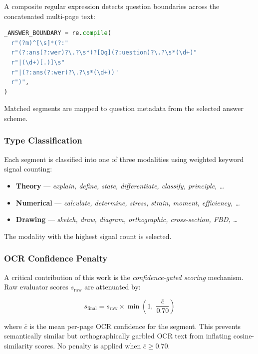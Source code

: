 \documentclass[conference]{IEEEtran}
\begin{document}
A composite regular expression detects question boundaries across the concatenated multi-page text:

\begin{lstlisting}[language=Python, caption={Answer boundary regex}]
_ANSWER_BOUNDARY = re.compile(
  r"(?m)^[\s]*(?:"
  r"(?:ans(?:wer)?\.?\s*)?[Qq](?:uestion)?\.?\s*(\d+)"
  r"|(\d+)[.)]\s"
  r"|(?:ans(?:wer)?\.?\s*(\d+))"
  r")",
)
\end{lstlisting}

Matched segments are mapped to question metadata from the selected answer scheme.

\subsubsection{Type Classification}

Each segment is classified into one of three modalities using weighted keyword signal counting:

\begin{itemize}
    \item \textbf{Theory} — \textit{explain, define, state, differentiate, classify, principle, \ldots}
    \item \textbf{Numerical} — \textit{calculate, determine, stress, strain, moment, efficiency, \ldots}
    \item \textbf{Drawing} — \textit{sketch, draw, diagram, orthographic, cross-section, FBD, \ldots}
\end{itemize}

The modality with the highest signal count is selected.

\subsubsection{OCR Confidence Penalty}

A critical contribution of this work is the \emph{confidence-gated scoring} mechanism. Raw evaluator scores $s_{\text{raw}}$ are attenuated by:

\begin{equation}
    s_{\text{final}} = s_{\text{raw}} \times \min\!\left(1,\; \frac{\bar{c}}{0.70}\right)
    \label{eq:penalty}
\end{equation}

where $\bar{c}$ is the mean per-page OCR confidence for the segment. This prevents semantically similar but orthographically garbled OCR text from inflating cosine-similarity scores. No penalty is applied when $\bar{c} \geq 0.70$.
\end{document}
